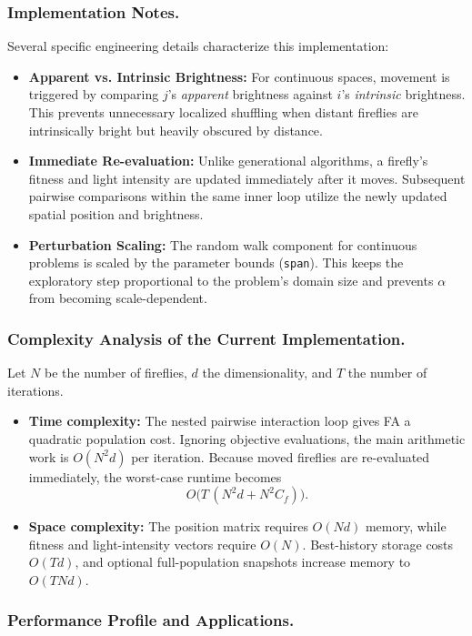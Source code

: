 \subsubsection{Implementation Notes.}
Several specific engineering details characterize this implementation:
\begin{itemize}
    \item \textbf{Apparent vs. Intrinsic Brightness:} For continuous spaces, movement is triggered by comparing $j$'s \textit{apparent} brightness against $i$'s \textit{intrinsic} brightness. This prevents unnecessary localized shuffling when distant fireflies are intrinsically bright but heavily obscured by distance.
    \item \textbf{Immediate Re-evaluation:} Unlike generational algorithms, a firefly's fitness and light intensity are updated immediately after it moves. Subsequent pairwise comparisons within the same inner loop utilize the newly updated spatial position and brightness.
  \item \textbf{Perturbation Scaling:} The random walk component for continuous problems is scaled by the parameter bounds (\texttt{span}). This keeps the exploratory step proportional to the problem's domain size and prevents $\alpha$ from becoming scale-dependent.
\end{itemize}

\subsubsection{Complexity Analysis of the Current Implementation.}
Let $N$ be the number of fireflies, $d$ the dimensionality, and $T$ the number of iterations.
\begin{itemize}
  \item \textbf{Time complexity:} The nested pairwise interaction loop gives FA a quadratic population cost. Ignoring objective evaluations, the main arithmetic work is $O(N^2 d)$ per iteration. Because moved fireflies are re-evaluated immediately, the worst-case runtime becomes
  $$
  O\big(T\,(N^2 d + N^2 C_f)\big).
  $$
  \item \textbf{Space complexity:} The position matrix requires $O(Nd)$ memory, while fitness and light-intensity vectors require $O(N)$. Best-history storage costs $O(Td)$, and optional full-population snapshots increase memory to $O(TNd)$.
\end{itemize}

\subsubsection{Performance Profile and Applications.}

